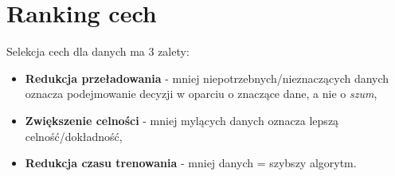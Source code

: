 \section{Ranking cech}
	Selekcja cech dla danych ma 3 zalety:
	
	\begin{itemize}
		\item \textbf{Redukcja przeładowania} - mniej niepotrzebnych/nieznaczących danych oznacza podejmowanie decyzji w oparciu o znaczące dane, a nie o \textit{szum},
		\item \textbf{Zwiększenie celności} - mniej mylących danych oznacza lepszą celność/dokładność,
		\item \textbf{Redukcja czasu trenowania} - mniej danych = szybszy algorytm.
	\end{itemize}
	